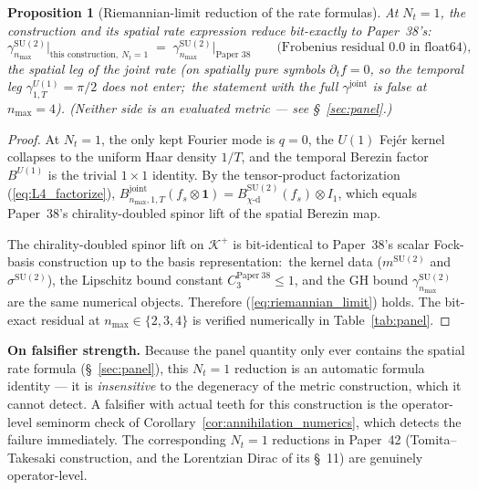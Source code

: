 \documentclass[11pt,a4paper]{article}
\theoremstyle{plain}
\newtheorem{proposition}[theorem]{Proposition}
\theoremstyle{definition}
\newcommand{\nmax}{n_{\max}}
\newcommand{\Nt}{N_{t}}
\newcommand{\Krein}{\mathcal{K}}
\newcommand{\SU}{\mathrm{SU}}
\newcommand{\Uone}{U(1)}
\newcommand{\Bjoint}{B^{\mathrm{joint}}}
\newcommand{\gammajoint}{\gamma^{\mathrm{joint}}}
\newcommand{\gammaSU}{\gamma^{\SU(2)}}
\newcommand{\gammaU}{\gamma^{\Uone}}
\newcommand{\Kplus}{\Krein^{+}}
\newcommand{\chid}{\chi\text{-d}}
\begin{document}
\begin{proposition}[Riemannian-limit reduction of the rate formulas]
\label{prop:riemannian_limit}
At $\Nt = 1$, the construction and its spatial rate expression reduce
bit-exactly to Paper~38's:
\begin{equation}\label{eq:riemannian_limit}
   \gammaSU_{\nmax}\big|_{\text{this construction},\ \Nt = 1}
   \;=\; \gammaSU_{\nmax}\big|_{\text{Paper~38}}
   \qquad \text{(Frobenius residual $0.0$ in float64),}
\end{equation}
the spatial leg of the joint rate (on spatially pure symbols
$\partial_t f = 0$, so the temporal leg $\gammaU_{1,T} = \pi/2$ does not
enter;\ the statement with the full $\gammajoint$ is false at $\nmax = 4$).
\emph{(Neither side is an evaluated metric — see
\S~\ref{sec:panel}.)}
\end{proposition}

\begin{proof}
At $\Nt = 1$, the only kept Fourier mode is $q = 0$, the $\Uone$ Fej\'er
kernel collapses to the uniform Haar density $1/T$, and the temporal
Berezin factor $B^{\Uone}$ is the trivial $1 \times 1$ identity. By the
tensor-product factorization (\ref{eq:L4_factorize}),
$\Bjoint_{\nmax, 1, T}(f_{s} \otimes \mathbf{1}) =
B^{\SU(2)}_{\chid}(f_{s}) \otimes I_{1}$, which equals
Paper~38's chirality-doubled spinor lift of the spatial Berezin map.

The chirality-doubled spinor lift on $\Kplus$ is bit-identical to
Paper~38's scalar Fock-basis construction up to the basis
representation:\ the kernel data ($m^{\SU(2)}$ and $\sigma^{\SU(2)}$),
the Lipschitz bound constant $C_{3}^{\mathrm{Paper~38}} \le 1$, and the
GH bound $\gammaSU_{\nmax}$ are the same numerical objects.
Therefore (\ref{eq:riemannian_limit}) holds. The bit-exact residual at
$\nmax \in \{2, 3, 4\}$ is verified numerically in Table~\ref{tab:panel}.
\qedhere
\end{proof}

\textbf{On falsifier strength.} Because the panel quantity only
ever contains the spatial rate formula (\S~\ref{sec:panel}), this
$\Nt = 1$ reduction is an automatic formula identity — it is
\emph{insensitive} to the degeneracy of the metric construction,
which it cannot detect. A falsifier with actual teeth for this
construction is the operator-level seminorm check of
Corollary~\ref{cor:annihilation_numerics}, which detects the failure
immediately. The corresponding $\Nt = 1$ reductions in Paper~42
(Tomita--Takesaki construction, and the Lorentzian Dirac of its \S~11) are
genuinely operator-level.
\end{document}
